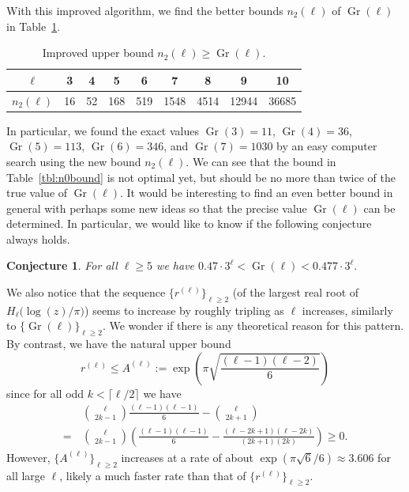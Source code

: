 \documentclass[11pt]{article}
\DeclareMathOperator{\Gr}{Gr}
\theoremstyle{plain}
\newtheorem{con}[thm]{Conjecture}
\theoremstyle{definition}
\begin{document}
With this improved algorithm, we find the better bounds $n_2(\ell)$ of $\Gr(\ell)$ in Table~\ref{tbl:Newn0bound}.
\begin{table}[h]
\centering\begin{tabular}{|c|c|c|c|c|c|c|c|c|}
\hline
$\ell$ &  3 & 4 & 5 & 6 & 7 & 8 & 9 & 10   \\
\hline
$n_2(\ell)$ &
16 & 52 & 168 & 519 & 1548 & 4514 & 12944 & 36685    \\
\hline
\end{tabular}
\caption{Improved upper bound $n_2(\ell)\ge \Gr(\ell)$.}
\label{tbl:Newn0bound}
\end{table}

In particular, we found the exact values $\Gr(3)=11$, $\Gr(4)=36$, $\Gr(5)=113$, $\Gr(6)=346$, and $\Gr(7)=1030$ by an easy computer search using the new bound $n_2(\ell)$. We can see that the bound in Table~\ref{tbl:n0bound} is not optimal yet, but should be no more than twice of the true value of $\Gr(\ell)$. It would be interesting to find an even better bound in general with perhaps some new ideas so that the precise value $\Gr(\ell)$ can be determined. In particular, we would like to know if the following conjecture always holds.

\begin{con}
For all $\ell\ge 5$ we have $0.47\cdot 3^\ell<\Gr(\ell)<0.477\cdot 3^\ell.$
\end{con}

We also notice that the sequence $\{r^{(\ell)}\}_{\ell\ge 2}$ (of the largest real root of $H_{\ell}\big(\log(z)/\pi\big)$) seems to increase by roughly tripling as $\ell$ increases, similarly to $\{\Gr(\ell)\}_{\ell\ge 2}$. We wonder if there is any theoretical reason for this pattern. By contrast, we have the natural upper bound
\begin{equation*}
r^{(\ell)} \le A^{(\ell)}:=\exp\left(\pi \sqrt{\frac{(\ell-1)(\ell-2)}{6}}\right)
\end{equation*}
since for all odd $k< \lceil \ell/2\rceil$ we have
\begin{align*}
\ &\, \binom{\ell}{2k-1} \frac{(\ell-1)(\ell-1)}{6}-\binom{\ell}{2k+1} \\
= &\, \binom{\ell}{2k-1} \left( \frac{(\ell-1)(\ell-1)}{6}- \frac{(\ell-2k+1)(\ell-2k)}{(2k+1)(2k)} \right)\ge 0.
\end{align*}
However, $\{A^{(\ell)}\}_{\ell\ge 2}$ increases at a rate of about $\exp(\pi \sqrt{6}/6)\approx 3.606$ for all large $\ell$, likely a much faster rate than that of $\{r^{(\ell)}\}_{\ell\ge 2}$.
\end{document}
